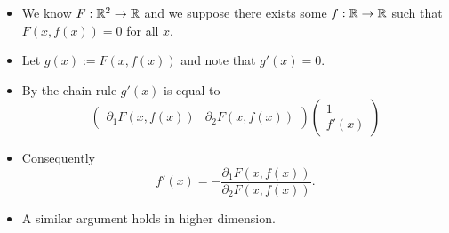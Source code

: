 \begin{itemize}
    \item
          We know \(F:\mathbb{R}^2 \to \mathbb{R}\) and we suppose there exists some \(f:\mathbb{R}\to\mathbb{R}\) such that
          \(F(x,f(x))=0\) for all \(x\).
    \item
          Let \(g(x):= F(x,f(x))\) and note that \(g'(x)=0\).
    \item
          By the chain rule \(g'(x) \) is equal to
          \[
              \begin{pmatrix}
                  \partial_1 F(x,f(x)) & \partial_2 F(x,f(x))
              \end{pmatrix}
              \begin{pmatrix}
                  1 \\
                  f'(x)
              \end{pmatrix}
          \]
    \item
          Consequently
          \[
              f'(x) = - \frac{\partial_1 F(x,f(x))}{\partial_2 F(x,f(x))}.
          \]
    \item
          A similar argument holds in higher dimension.
\end{itemize}









